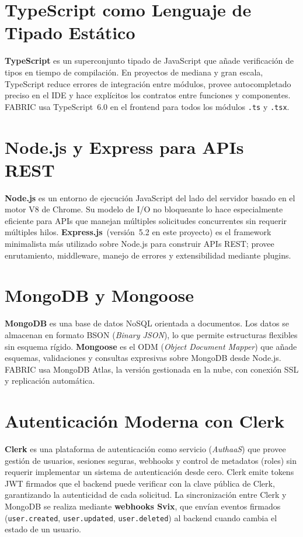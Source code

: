 \documentclass[12pt, a4paper, twoside]{report}
\begin{document}
\section{TypeScript como Lenguaje de Tipado Estático}

\textbf{TypeScript} es un superconjunto tipado de JavaScript que añade verificación de tipos
en tiempo de compilación. En proyectos de mediana y gran escala, TypeScript reduce errores de
integración entre módulos, provee autocompletado preciso en el IDE y hace explícitos los
contratos entre funciones y componentes. FABRIC usa TypeScript~6.0 en el frontend para todos
los módulos \texttt{.ts} y \texttt{.tsx}.

\section{Node.js y Express para APIs REST}

\textbf{Node.js} es un entorno de ejecución JavaScript del lado del servidor basado en el
motor V8 de Chrome. Su modelo de I/O no bloqueante lo hace especialmente eficiente para APIs
que manejan múltiples solicitudes concurrentes sin requerir múltiples hilos.
\textbf{Express.js}~(versión~5.2 en este proyecto) es el framework minimalista más utilizado
sobre Node.js para construir APIs REST; provee enrutamiento, middleware, manejo de errores y
extensibilidad mediante plugins.

\section{MongoDB y Mongoose}

\textbf{MongoDB} es una base de datos NoSQL orientada a documentos. Los datos se almacenan en
formato BSON (\textit{Binary JSON}), lo que permite estructuras flexibles sin esquema rígido.
\textbf{Mongoose} es el ODM (\textit{Object Document Mapper}) que añade esquemas, validaciones
y consultas expresivas sobre MongoDB desde Node.js. FABRIC usa MongoDB Atlas, la versión
gestionada en la nube, con conexión SSL y replicación automática.

\section{Autenticación Moderna con Clerk}

\textbf{Clerk} es una plataforma de autenticación como servicio (\textit{AuthaaS}) que provee
gestión de usuarios, sesiones seguras, webhooks y control de metadatos (roles) sin requerir
implementar un sistema de autenticación desde cero. Clerk emite tokens JWT firmados que el
backend puede verificar con la clave pública de Clerk, garantizando la autenticidad de cada
solicitud. La sincronización entre Clerk y MongoDB se realiza mediante \textbf{webhooks Svix},
que envían eventos firmados (\texttt{user.created}, \texttt{user.updated},
\texttt{user.deleted}) al backend cuando cambia el estado de un usuario.
\end{document}
